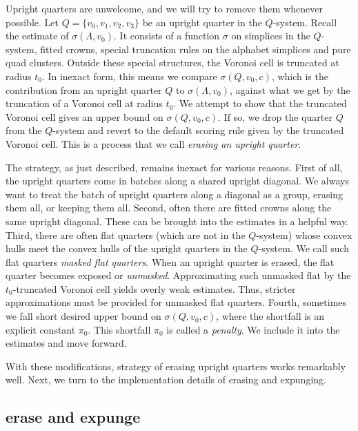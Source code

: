 Upright quarters are unwelcome, and we will try to remove them whenever
possible.  Let $Q=\{v_0,v_1,v_2,v_3\}$ be an upright quarter in the $Q$-system.   Recall the estimate of $\sigma(\Lambda,v_0)$.  It consists of a function
$\sigma$ on simplices in the $Q$-system, fitted crowns, special truncation rules on the alphabet simplices and pure quad clusters.  Outside these special structures, the Voronoi cell is truncated at radius $t_0$.
In inexact form, this means we compare $\sigma(Q,v_0,c)$, which
is the contribution from an upright quarter $Q$ to $\sigma(\Lambda,v_0)$, against what
we get by the truncation of a Voronoi cell at radius $t_0$.  We attempt
to show that the truncated Voronoi cell gives an upper bound on $\sigma(Q,v_0,c)$.  If so, we drop the quarter $Q$ from the $Q$-system and revert to
the default scoring rule given by the truncated Voronoi cell.  This
is a process that we call {\it erasing an upright quarter}.  

The strategy, as just described, remains inexact for various reasons.  
First of all, the upright quarters
come in batches along a shared upright diagonal.  We always want 
to treat the batch of upright
quarters along a diagonal as a group, erasing them all, or keeping them all.
Second, often there are fitted crowns along the same upright diagonal.
These can be brought into the estimates in a helpful way.
Third, there are often flat quarters (which are not in the $Q$-system) 
whose convex hulls
meet the convex hulls of the upright quarters in the $Q$-system.  
We call such flat quarters {\it masked flat quarters}.  When an upright
quarter is erased, the flat quarter becomes exposed or {\it unmasked}.
Approximating such unmasked flat by the $t_0$-truncated Voronoi cell
yields overly weak estimates.  Thus, stricter
approximations must be provided for unmasked flat quarters.
Fourth, sometimes we fall short desired upper bound on
$\sigma(Q,v_0,c)$,  where the shortfall is an explicit constant $\pi_0$.
This shortfall $\pi_0$ is called a {\it penalty}.  We include it into the
estimates and move forward.


With these modifications,  strategy of erasing upright quarters
works remarkably well.  
Next, we turn to the implementation details of erasing and expunging.





\subsection{erase and expunge}

